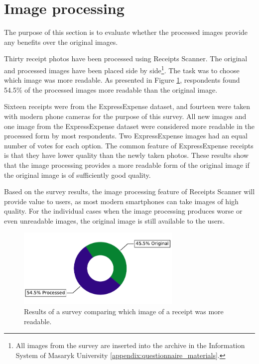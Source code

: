 \documentclass[
  printed, %
  table,   %
  oneside, %
  lof,     %
  lot,     %
]{fithesis3}
\begin{document}
\section{Image processing}
The purpose of this section is to evaluate whether the processed images provide any benefits over the original images.

Thirty receipt photos have been processed using Receipts Scanner. The original and processed images have been placed side by side\footnote{All images from the survey are inserted into the archive in the Information System of Masaryk University \ref{appendix:questionnaire_materials}.}. The task was to choose which image was more readable. As presented in Figure \ref{fig:which_image_is_more_readable}, respondents found 54.5\% of the processed images more readable than the original image.

Sixteen receipts were from the ExpressExpense \cite{ExpressExpense2019Receipt} dataset, and fourteen were taken with modern phone cameras for the purpose of this survey.
All new images and one image from the ExpressExpense dataset were considered more readable in the processed form by most respondents. Two ExpressExpense images had an equal number of votes for each option. The common feature of ExpressExpense receipts is that they have lower quality than the newly taken photos. These results show that the image processing provides a more readable form of the original image if the original image is of sufficiently good quality.

Based on the survey results, the image processing feature of Receipts Scanner will provide value to users, as most modern smartphones can take images of high quality. For the individual cases when the image processing produces worse or even unreadable images, the original image is still available to the users.

\begin{figure}
    \begin{center}
        \includegraphics[width=0.7\textwidth]{figures/graphs/which_image_is_more_readable}
    \end{center}
    \caption{Results of a survey comparing which image of a receipt was more readable.}
    \label{fig:which_image_is_more_readable}
\end{figure}
\end{document}
